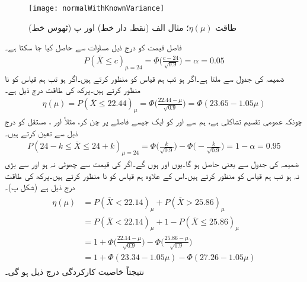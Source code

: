 \begin{figure}
\centering
\texttt{[image: normalWithKnownVariance]}
\caption{طاقت $\eta(\mu)$؛ مثال   الف (نقطہ دار خط) اور پ (ٹھوس خط)}
\label{شکل_مثال_شماریات_معلوم_تغیریت_عمومی_تقسیم_کی_اوسط}
\end{figure}
\quad
فاصل قیمت  کو درج ذیل مساوات سے حاصل کیا جا سکتا ہے۔
\begin{align*}
P(\overline{X}\le c)_{\mu=24}=\Phi\big(\frac{c-24}{\sqrt{0.9}}\big)=\alpha=0.05
\end{align*}
ضمیمہ  کی جدول   سے  ملتا ہے۔اگر  ہو تب ہم قیاس کو منظور کرتے ہیں۔اگر  ہو تب ہم قیاس کو نا منظور کرتے ہیں۔پرکھ کی طاقت درج ذیل ہے۔
\begin{align}
\eta(\mu)=P(\overline{X}\le 22.44)_{\mu}=\Phi\big(\frac{22.44-\mu}{\sqrt{0.9}}\big)=\Phi(23.65-1.05\mu)
\end{align}
\quad
چونکہ عمومی تقسیم تشاکلی ہے، ہم  سے  اور  کو ایک جیسے فاصلے پر چن کر، مثلاً  اور ، مستقل  کو درج ذیل سے تعین کرتے ہیں۔
\begin{align*}
P(24-k\le \overline{X}\le 24+k)_{\mu=24}=\Phi\big(\frac{k}{\sqrt{0.9}}\big)-\Phi\big(-\frac{k}{\sqrt{0.9}}\big)=1-\alpha=0.95
\end{align*}
ضمیمہ  کی جدول  سے  یعنی  حاصل ہو گا۔یوں  اور  ہوں گے۔اگر  کی قیمت  سے چھوٹی نہ ہو اور  سے بڑی نہ ہو تب ہم قیاس کو منظور کرتے ہیں۔اس کے علاوہ ہم قیاس کو نا منظور کرتے ہیں۔پرکھ کی طاقت درج ذیل ہے (شکل  پ)۔
\begin{gather}
\begin{aligned}
\eta(\mu)&=P(\overline{X}<22.14)_{\mu}+P(\overline{X}>25.86)_{\mu}\\
&=P(\overline{X}<22.14)_{\mu}+1-P(\overline{X}\le 25.86)_{\mu}\\
&=1+\Phi\big(\frac{22.14-\mu}{\sqrt{0.9}}\big)-\Phi\big(\frac{25.86-\mu}{\sqrt{0.9}}\big)\\
&=1+\Phi(23.34-1.05\mu)-\Phi(27.26-1.05\mu)
\end{aligned}
\end{gather}
نتیجتاً خاصیت کارکردگی  درج ذیل ہو گی۔
